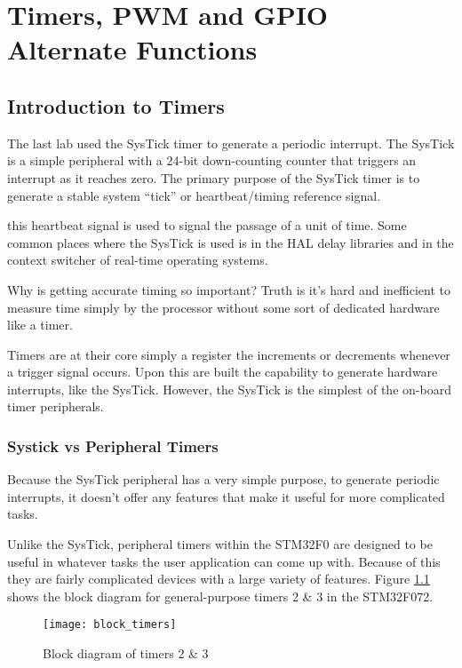 \documentclass[11pt,fleqn]{book} %
\begin{document}
	
\chapter{Timers, PWM and GPIO Alternate Functions}

\section{Introduction to Timers}
The last lab used the SysTick timer to generate a periodic interrupt. The SysTick is a simple peripheral with a 24-bit down-counting counter that triggers an interrupt as it reaches zero. The primary purpose of the SysTick timer is to generate a stable system ``tick'' or heartbeat/timing reference signal. 

this heartbeat signal is used to signal the passage of a unit of time. Some common places where the SysTick is used is in the HAL delay libraries and in the context switcher of real-time operating systems. 

Why is getting accurate timing so important? Truth is it's hard and inefficient to measure time simply by the processor without some sort of dedicated hardware like a timer. 

Timers are at their core simply a register the increments or decrements whenever a trigger signal occurs. Upon this are built the capability to generate hardware interrupts, like the SysTick. However, the SysTick is the simplest of the on-board timer peripherals.
    
    \subsection{Systick vs Peripheral Timers}
     Because the SysTick peripheral has a very simple purpose, to generate periodic interrupts, it doesn't offer any features that make it useful for more complicated tasks. 
     
     Unlike the SysTick, peripheral timers within the STM32F0 are designed to be useful in whatever tasks the user application can come up with. Because of this they are fairly complicated devices with a large variety of features. Figure \ref{block_timers} shows the block diagram for general-purpose timers 2 \& 3 in the STM32F072.     

        \begin{figure}[]
            \centering\texttt{[image: block\_timers]}
            \caption{Block diagram of timers 2 \& 3}
            \label{block_timers}
        \end{figure}
        
\end{document}
